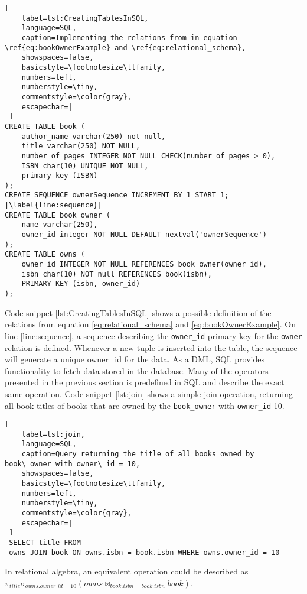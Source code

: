 \begin{lstlisting}[
    label=lst:CreatingTablesInSQL,
    language=SQL,
    caption=Implementing the relations from in equation \ref{eq:bookOwnerExample} and \ref{eq:relational_schema},
    showspaces=false,
    basicstyle=\footnotesize\ttfamily,
    numbers=left,
    numberstyle=\tiny,
    commentstyle=\color{gray},
    escapechar=|
 ]
CREATE TABLE book (
    author_name varchar(250) not null,
    title varchar(250) NOT NULL,
    number_of_pages INTEGER NOT NULL CHECK(number_of_pages > 0),
    ISBN char(10) UNIQUE NOT NULL,
    primary key (ISBN)
);
CREATE SEQUENCE ownerSequence INCREMENT BY 1 START 1; |\label{line:sequence}|
CREATE TABLE book_owner (
    name varchar(250),
    owner_id integer NOT NULL DEFAULT nextval('ownerSequence')
);
CREATE TABLE owns (
    owner_id INTEGER NOT NULL REFERENCES book_owner(owner_id),
    isbn char(10) NOT null REFERENCES book(isbn),
    PRIMARY KEY (isbn, owner_id)
);
\end{lstlisting}

Code snippet \ref{lst:CreatingTablesInSQL} shows a possible definition of the relations from equation \ref{eq:relational_schema} and \ref{eq:bookOwnerExample}.
On line \ref{line:sequence}, a sequence describing the \texttt{owner\_id} primary key for the \texttt{owner} relation is defined.
Whenever a new tuple is inserted into the table, the sequence will generate a unique owner\_id for the data.
As a DML, SQL provides functionality to fetch data stored in the database. 
Many of the operators presented in the previous section is predefined in SQL and describe the exact same operation. 
Code snippet \ref{lst:join} shows a simple join operation, returning all book titles of books that are owned by the \texttt{book\_owner} with \texttt{owner\_id} 10.

\begin{lstlisting}[
    label=lst:join,
    language=SQL,
    caption=Query returning the title of all books owned by book\_owner with owner\_id = 10,
    showspaces=false,
    basicstyle=\footnotesize\ttfamily,
    numbers=left,
    numberstyle=\tiny,
    commentstyle=\color{gray},
    escapechar=|
 ]
 SELECT title FROM
 owns JOIN book ON owns.isbn = book.isbn WHERE owns.owner_id = 10  
\end{lstlisting}

In relational algebra, an equivalent operation could be described as \\$\pi_{title}\sigma_{owns.owner\_id = 10}(owns \Join_{book.isbn = book.isbn} book )$.


